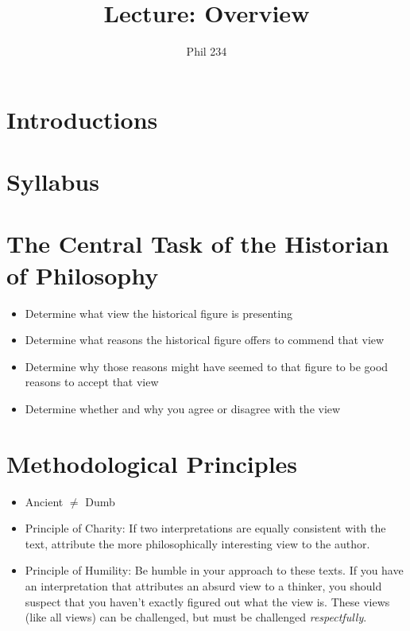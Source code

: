 \documentclass[11pt]{article}
\begin{document}
\author{Phil 234}
\title{Lecture: Overview}
\maketitle
\section*{Introductions}

\section*{Syllabus} 

\section*{The Central Task of the Historian of Philosophy}

\begin{itemize}
\item{Determine what view the historical figure is presenting}
\item{Determine what reasons the historical figure offers to commend that view}
\item{Determine why those reasons might have seemed to that figure to be good reasons to accept that view}
\item{Determine whether and why you agree or disagree with the view}
\end{itemize}

\section*{Methodological Principles}

\begin{itemize} 
\item{Ancient $\neq$ Dumb}
\item{Principle of Charity: If two interpretations are equally consistent with the text, attribute the more philosophically interesting view to the author.}
\item{Principle of Humility: Be humble in your approach to these texts. If you have an interpretation that attributes an absurd view to a thinker, you should suspect that you haven't exactly figured out what the view is. These views (like all views) can be challenged, but must be challenged \emph{respectfully}.}
\end{itemize}
\end{document}
